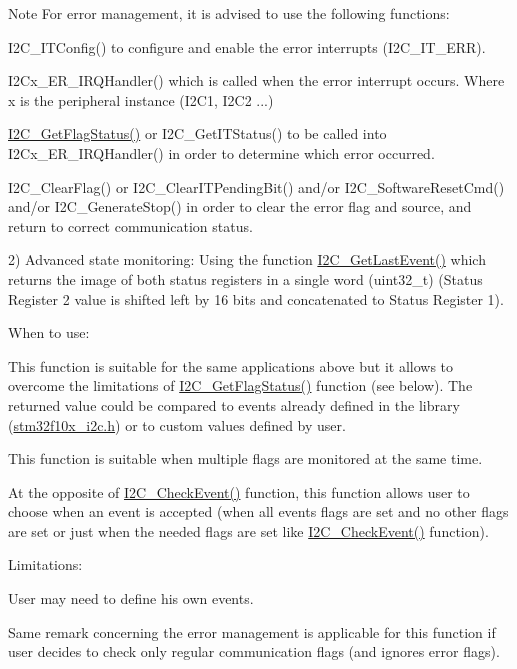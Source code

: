 \begin{DoxyNote}{Note}
For error management, it is advised to use the following functions:
\begin{DoxyItemize}
\item I2C\_\-ITConfig() to configure and enable the error interrupts (I2C\_\-IT\_\-ERR).
\item I2Cx\_\-ER\_\-IRQHandler() which is called when the error interrupt occurs. Where x is the peripheral instance (I2C1, I2C2 ...)
\item \hyperlink{group__I2C__Exported__Functions_ga15c95d0ed124f029621a2061b1677ee7}{I2C\_\-GetFlagStatus()} or I2C\_\-GetITStatus() to be called into I2Cx\_\-ER\_\-IRQHandler() in order to determine which error occurred.
\item I2C\_\-ClearFlag() or I2C\_\-ClearITPendingBit() and/or I2C\_\-SoftwareResetCmd() and/or I2C\_\-GenerateStop() in order to clear the error flag and source, and return to correct communication status.
\end{DoxyItemize}
\end{DoxyNote}
2) Advanced state monitoring: Using the function \hyperlink{group__I2C__Exported__Functions_ga29237aea9b5a3ead33167e1d027e9f1a}{I2C\_\-GetLastEvent()} which returns the image of both status registers in a single word (uint32\_\-t) (Status Register 2 value is shifted left by 16 bits and concatenated to Status Register 1).
\begin{DoxyItemize}
\item When to use:
\begin{DoxyItemize}
\item This function is suitable for the same applications above but it allows to overcome the limitations of \hyperlink{group__I2C__Exported__Functions_ga15c95d0ed124f029621a2061b1677ee7}{I2C\_\-GetFlagStatus()} function (see below). The returned value could be compared to events already defined in the library (\hyperlink{stm32f10x__i2c_8h}{stm32f10x\_\-i2c.h}) or to custom values defined by user.
\item This function is suitable when multiple flags are monitored at the same time.
\item At the opposite of \hyperlink{group__I2C__Exported__Functions_ga2d5701342f9d4c1f09bf9d3cdcacc326}{I2C\_\-CheckEvent()} function, this function allows user to choose when an event is accepted (when all events flags are set and no other flags are set or just when the needed flags are set like \hyperlink{group__I2C__Exported__Functions_ga2d5701342f9d4c1f09bf9d3cdcacc326}{I2C\_\-CheckEvent()} function).
\end{DoxyItemize}
\item Limitations:
\begin{DoxyItemize}
\item User may need to define his own events.
\item Same remark concerning the error management is applicable for this function if user decides to check only regular communication flags (and ignores error flags).
\end{DoxyItemize}
\end{DoxyItemize}

